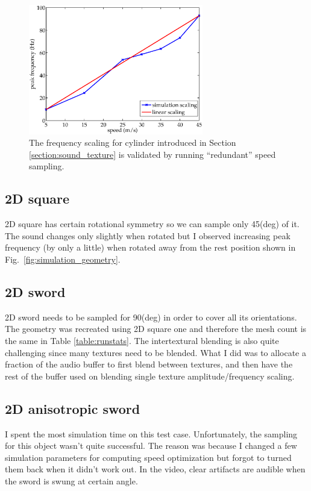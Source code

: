 \documentclass[tog]{acmsiggraph}
\begin{document}
\begin{figure}[ht]
  \centering
  \includegraphics[width=3.0in]{images/cylinder_frequency_scaling.eps}
  \caption{The frequency scaling for cylinder introduced in Section \ref{section:sound_texture} is validated by running ``redundant'' speed sampling.}
  \label{fig:frequency_scaling}
\end{figure}

\subsection{2D square} 
2D square has certain rotational symmetry so we can sample only 45(deg) of it. The sound changes only slightly when rotated but I observed increasing peak frequency (by only a little) when rotated away from the rest position shown in Fig.~\ref{fig:simulation_geometry}. 

\subsection{2D sword} 
2D sword needs to be sampled for 90(deg) in order to cover all its orientations. The geometry was recreated using 2D square one and therefore the mesh count is the same in Table \ref{table:runstats}. The intertextural blending is also quite challenging since many textures need to be blended. What I did was to allocate a fraction of the audio buffer to first blend between textures, and then have the rest of the buffer used on blending single texture amplitude/frequency scaling.

\subsection{2D anisotropic sword} 
I spent the most simulation time on this test case. Unfortunately, the sampling for this object wasn't quite successful. The reason was because I changed a few simulation parameters for computing speed optimization but forgot to turned them back when it didn't work out. In the video, clear artifacts are audible when the sword is swung at certain angle. 
\end{document}
